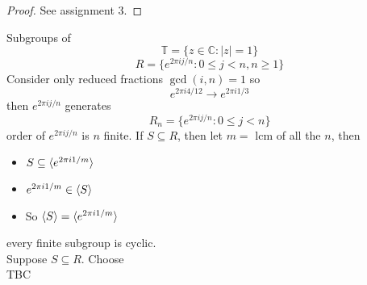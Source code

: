 \documentclass[openany]{report}
\begin{document}
\begin{proof}
    See assignment 3.
\end{proof}
Subgroups of 
\[\mathbb{T} = \{z \in \mathbb{C} : |z|  = 1\}\]
\[R = \{e^{2\pi ij/n}: 0 \leq j < n, n \geq 1\}\]
Consider only reduced fractions $\gcd(i,n) = 1$ so 
\[e^{2\pi  i 4/12} \rightarrow e^{2\pi i 1/3}\]
then $e^{2\pi i j/n}$ generates 
\[R_n = \{e^{2\pi ij/n}: 0 \leq j < n\}\]
order of $e^{2\pi ij/n}$ is $n$ finite. If $S \subseteq R$, then let $m =$ lcm of all the $n$, then 
\begin{itemize}
    \item $S \subseteq \langle e^{2\pi i 1/m} \rangle$
    \item $e^{2\pi i 1/m} \in \langle S \rangle$
    \item So $\langle S \rangle = \langle e^{2\pi i1/m} \rangle$
\end{itemize}
every finite subgroup is cyclic.\\[2ex]
Suppose $S \subseteq R$. Choose\\
TBC 
\chapter{}
\chapter{}
\chapter{}
\chapter{}
\chapter{}
\chapter{}
\chapter{}

\end{document}
